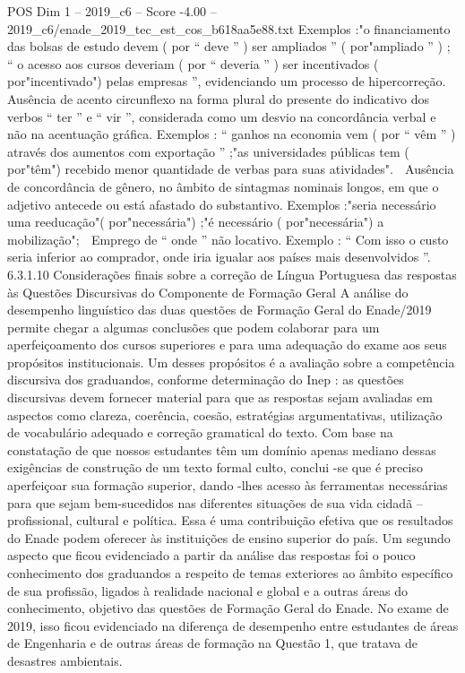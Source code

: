 \begin{textsample}{POS Dim 1 – 2019\_c6 – Score -4.00 – 2019\_c6/enade\_2019\_tec\_est\_cos\_b618aa5e88.txt}
Exemplos :"o financiamento das bolsas de estudo devem ( por “ deve ” ) ser ampliados ” ( por"ampliado ” ) ; “ o acesso aos cursos deveriam ( por “ deveria ” ) ser incentivados ( por"incentivado") pelas empresas ”, evidenciando um processo de hipercorreção.  Ausência de acento circunflexo na forma plural do presente do indicativo dos verbos “ ter ” e “ vir ”, considerada como um desvio na concordância verbal e não na acentuação gráfica.
Exemplos : “ ganhos na economia vem ( por “ vêm ” ) através dos aumentos com exportação ” ;"as universidades públicas tem ( por"têm") recebido menor quantidade de verbas para suas atividades".  Ausência de concordância de gênero, no âmbito de sintagmas nominais longos, em que o adjetivo antecede ou está afastado do substantivo.
Exemplos :"seria necessário uma reeducação"( por"necessária") ;"é necessário ( por"necessária") a mobilização";  Emprego de “ onde ” não locativo.
Exemplo : “ Com isso o custo seria inferior ao comprador, onde iria igualar aos países mais desenvolvidos ”. 6.3.1.10 Considerações finais sobre a correção de Língua Portuguesa das respostas às Questões Discursivas do Componente de Formação Geral A análise do desempenho linguístico das duas questões de Formação Geral do Enade/2019 permite chegar a algumas conclusões que podem colaborar para um aperfeiçoamento dos cursos superiores e para uma adequação do exame aos seus propósitos institucionais.
Um desses propósitos é a avaliação sobre a competência discursiva dos graduandos, conforme determinação do Inep : as questões discursivas devem fornecer material para que as respostas sejam avaliadas em aspectos como clareza, coerência, coesão, estratégias argumentativas, utilização de vocabulário adequado e correção gramatical do texto.
Com base na constatação de que nossos estudantes têm um domínio apenas mediano dessas exigências de construção de um texto formal culto, conclui -se que é preciso aperfeiçoar sua formação superior, dando -lhes acesso às ferramentas necessárias para que sejam bem-sucedidos nas diferentes situações de sua vida cidadã – profissional, cultural e política.
Essa é uma contribuição efetiva que os resultados do Enade podem oferecer às instituições de ensino superior do país.
Um segundo aspecto que ficou evidenciado a partir da análise das respostas foi o pouco conhecimento dos graduandos a respeito de temas exteriores ao âmbito específico de sua profissão, ligados à realidade nacional e global e a outras áreas do conhecimento, objetivo das questões de Formação Geral do Enade.
No exame de 2019, isso ficou evidenciado na diferença de desempenho entre estudantes de áreas de Engenharia e de outras áreas de formação na Questão 1, que tratava de desastres ambientais.

\end{textsample}

